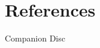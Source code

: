 \documentclass[titlesmallcaps, examinerscopy, copyrightpage]{uqthesis}
\begin{document}
\cite{dummy:2012}


\cleardoublepage

\chapter*{References}

\begingroup
\renewcommand{\chapter}[2]{}

\endgroup


\appendix

\chapter{Source Code}

\chapter{Companion Disc}
\end{document}
